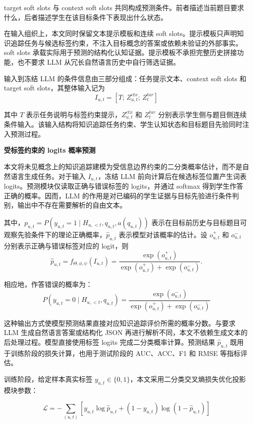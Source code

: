 \documentclass[UTF8,a4paper,12pt]{ctexart}
\numberwithin{table}{section}
\begin{document}
target soft slots 与 context soft slots 共同构成预测条件。前者描述当前题目要求什么，后者描述学生在该目标条件下表现出什么状态。


在输入组织上，本文同时保留文本提示模板和连续 soft slots。提示模板只声明知识追踪任务与候选标签约束，不注入目标概念的答案或依赖未验证的外部事实。soft slots 承载实际用于预测的结构化认知证据。提示模板不承担完整历史拼接功能，也不要求 LLM 从冗长自然语言历史中自行筛选证据。

输入到冻结 LLM 的条件信息由三部分组成：任务提示文本、context soft slots 和 target soft slots，其整体输入记为
\[
I_{u,t}=[T;\,Z^{ctx}_{u,t};\,Z^{tar}_{t}]
\]

其中 \(T\) 表示任务说明与标签约束提示，\(Z^{ctx}_{u,t}\) 和 \(Z^{tar}_{t}\) 分别表示学生侧与题目侧连续条件输入。该输入结构将知识追踪任务约束、学生认知状态和目标题目先验同时注入预测过程。

\noindent\textbf{受标签约束的 logits 概率预测}



本文将未见概念上的知识追踪建模为受信息边界约束的二分类概率估计，而不是自然语言生成任务。对于输入 \(I_{u,t}\)，冻结 LLM 前向计算后在候选标签位置产生词表 logits。预测模块仅读取正确与错误标签的 logits，并通过 softmax 得到学生作答正确的概率。因而，LLM 的作用是对已编码的学生证据与目标先验进行条件判别，输出中不存在需要解析的自由文本。



其中，\(p_{u,t}=P(y_{u,t}=1\mid H_{u,<t},q_{u,t},a(q_{u,t}))\) 表示在目标前历史与目标题目可观察先验条件下的理论正确概率，\(\hat p_{u,t}\) 表示模型对该概率的估计。设 \(o^{+}_{u,t}\) 和 \(o^{-}_{u,t}\) 分别表示正确与错误标签对应的 logit，则
\[
\hat p_{u,t}=f_{\Theta,\phi,\psi}(I_{u,t})=\frac{\exp(o^{+}_{u,t})}{\exp(o^{+}_{u,t})+\exp(o^{-}_{u,t})}.
\]

相应地，作答错误的概率为：
\[
P(y_{u,t}=0 \mid H_{u,<t}, q_{u,t}) = \frac{\exp(o^{-}_{u,t})}{\exp(o^{+}_{u,t}) + \exp(o^{-}_{u,t})}
\]

这种输出方式使模型预测结果直接对应知识追踪评价所需的概率分数。与要求 LLM 生成自然语言答案或结构化 JSON 再进行解析不同，本文不依赖生成文本的后处理过程。模型直接使用标签 logits 完成二分类概率计算。预测结果 \(\hat{p}_{u,t}\) 既用于训练阶段的损失计算，也用于测试阶段的 AUC、ACC、F1 和 RMSE 等指标评估。

训练阶段，给定样本真实标签 \(y_{u,t} \in \{0,1\}\)，本文采用二分类交叉熵损失优化投影模块参数：

\[
\mathcal{L} = -\sum_{(u,t)} \left[
    y_{u,t} \log \hat{p}_{u,t}
    + (1-y_{u,t}) \log(1-\hat{p}_{u,t})
\right]
\]
\end{document}
